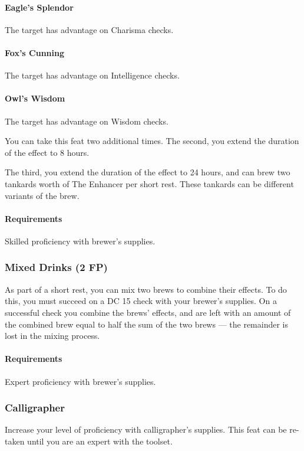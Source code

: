     \paragraph{Eagle's Splendor} The target has advantage on Charisma checks.
    \paragraph{Fox's Cunning} The target has advantage on Intelligence checks.
    \paragraph{Owl's Wisdom} The target has advantage on Wisdom checks.

    You can take this feat two additional times.
    The second, you extend the duration of the effect to 8 hours.

    The third, you extend the duration of the effect to 24 hours, and can brew two tankards worth of The Enhancer per short rest.
    These tankards can be different variants of the brew.
    \paragraph{Requirements} Skilled proficiency with brewer's supplies.
\subsubsection{Mixed Drinks (2 FP)} \label{feat::mixeddrinks}
    As part of a short rest, you can mix two brews to combine their effects.
    To do this, you must succeed on a DC 15 check with your brewer's supplies.
    On a successful check you combine the brews' effects, and are left with an amount of the combined brew equal to half the sum of the two brews --- the remainder is lost in the mixing process.
    \paragraph{Requirements} Expert proficiency with brewer's supplies.

\subsubsection{Calligrapher} \label{feat::calligrapher}
    Increase your level of proficiency with calligrapher's supplies.
    This feat can be re-taken until you are an expert with the toolset.

